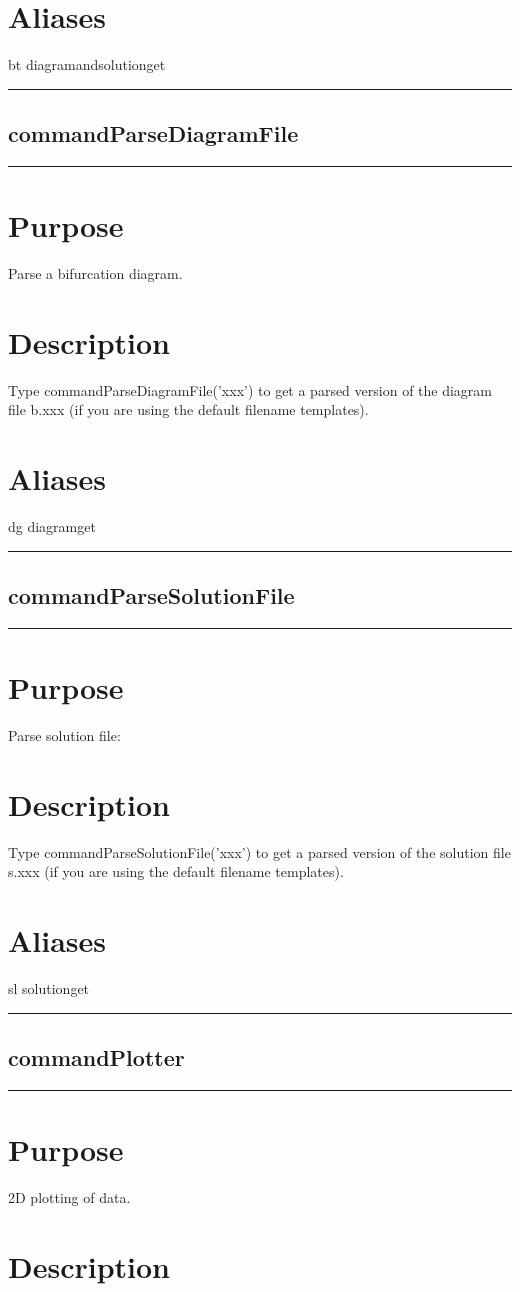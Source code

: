 \documentclass[12pt]{report}
\begin{document}
\begin{minipage}{6in}
    \section*{Aliases}
bt diagramandsolutionget \medskip\hrule\end{minipage}\subsection{commandParseDiagramFile} \label{sec:clui_ref_commandParseDiagramFile}\begin{minipage}{6in}\hrule\medskip\section*{Purpose}
Parse a bifurcation diagram.\section*{Description}

    Type commandParseDiagramFile('xxx') to get a parsed version of the diagram file b.xxx
    (if you are using the default filename templates).
    \section*{Aliases}
dg diagramget \medskip\hrule\end{minipage}\subsection{commandParseSolutionFile} \label{sec:clui_ref_commandParseSolutionFile}\begin{minipage}{6in}\hrule\medskip\section*{Purpose}
Parse solution file:\section*{Description}

    Type commandParseSolutionFile('xxx') to get a parsed version of the solution file
    s.xxx (if you are using the default filename templates).
    \section*{Aliases}
sl solutionget \medskip\hrule\end{minipage}\subsection{commandPlotter} \label{sec:clui_ref_commandPlotter}\begin{minipage}{6in}\hrule\medskip\section*{Purpose}
2D plotting of data.\section*{Description}


\end{minipage}
\end{document}

